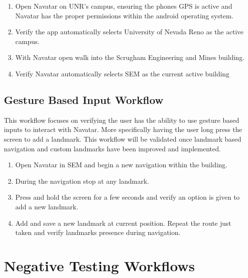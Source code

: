 \documentclass{scrreprt}
\begin{document}
\begin{enumerate}
	\item Open Navatar on UNR’s campus, ensuring the phones GPS is active and Navatar has the proper permissions within the android operating system.
	
	\item Verify the app automatically selects University of Nevada Reno as the active campus.
	
	\item With Navatar open walk into the Scrugham Engineering and Mines building.
	
	\item Verify Navatar automatically selects SEM as the current active building

\end{enumerate}

\pagebreak

\subsection{Gesture Based Input Workflow}

This workflow focuses on verifying the user has the ability to use gesture based inputs to interact with Navatar. More specifically having the user long press the screen to add a landmark. This workflow will be validated once landmark based navigation and custom landmarks have been improved and implemented.

\begin{enumerate}
	\item Open Navatar in SEM and begin a new navigation within the building.
	
	\item During the navigation stop at any landmark.
	
	\item Press and hold the screen for a few seconds and verify an option is given to add a new landmark.
	
	\item Add and save a new landmark at current position.
Repeat the route just taken and verify landmarks presence during navigation.

\end{enumerate}

\pagebreak

\section{Negative Testing Workflows}
\end{document}
